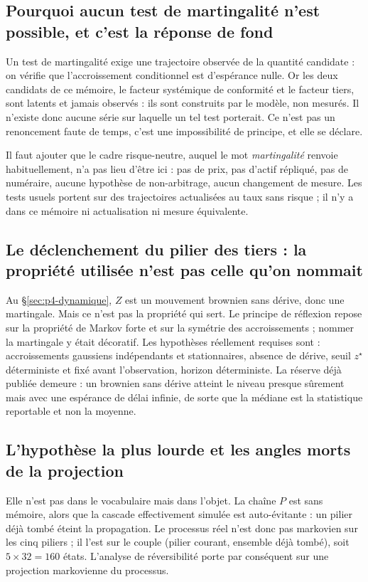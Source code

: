 \subsection*{Pourquoi aucun test de martingalité n'est possible, et c'est la réponse de fond}

Un test de martingalité exige une trajectoire observée de la quantité candidate : on
vérifie que l'accroissement conditionnel est d'espérance nulle. Or les deux candidats de ce
mémoire, le facteur systémique de conformité et le facteur tiers, sont latents et jamais
observés : ils sont construits par le modèle, non mesurés. Il n'existe donc aucune série sur
laquelle un tel test porterait. Ce n'est pas un renoncement faute de temps, c'est une
impossibilité de principe, et elle se déclare.

Il faut ajouter que le cadre risque-neutre, auquel le mot \emph{martingalité} renvoie
habituellement, n'a pas lieu d'être ici : pas de prix, pas d'actif répliqué, pas de numéraire,
aucune hypothèse de non-arbitrage, aucun changement de mesure. Les tests usuels portent sur des
trajectoires actualisées au taux sans risque ; il n'y a dans ce mémoire ni actualisation ni
mesure équivalente.

\subsection*{Le déclenchement du pilier des tiers : la propriété utilisée n'est pas celle qu'on
nommait}

Au \S\ref{sec:p4-dynamique}, $Z$ est un mouvement brownien sans dérive, donc une
martingale. Mais ce n'est pas la propriété qui sert. Le principe de réflexion repose sur
la propriété de Markov forte et sur la symétrie des accroissements ; nommer la
martingale y était décoratif. Les hypothèses réellement requises sont : accroissements gaussiens
indépendants et stationnaires, absence de dérive, seuil $z^\star$ déterministe et fixé avant
l'observation, horizon déterministe. La réserve déjà publiée demeure : un brownien sans dérive
atteint le niveau presque sûrement mais avec une espérance de délai infinie, de sorte que la
médiane est la statistique reportable et non la moyenne.

\subsection*{L'hypothèse la plus lourde et les angles morts de la projection}

Elle n'est pas dans le vocabulaire mais dans l'objet. La chaîne $P$ est sans mémoire,
alors que la cascade effectivement simulée est auto-évitante : un pilier déjà tombé
éteint la propagation. Le processus réel n'est donc pas markovien sur les cinq piliers ; il l'est
sur le couple (pilier courant, ensemble déjà tombé), soit $5 \times 32 = 160$ états. L'analyse de
réversibilité porte par conséquent sur une projection markovienne du processus.


